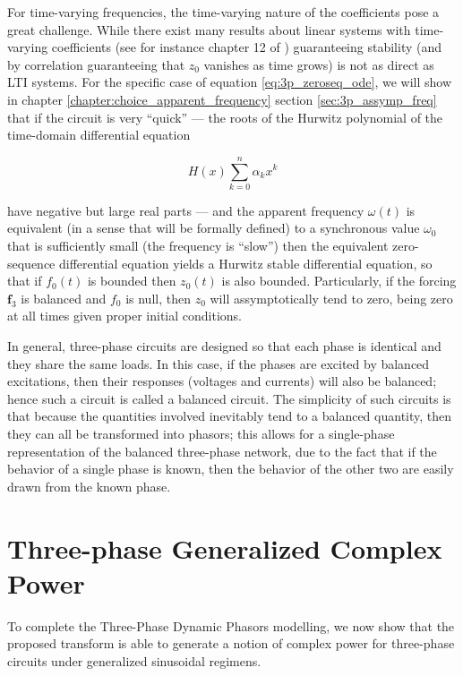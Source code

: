 	For time-varying frequencies, the time-varying nature of the coefficients pose a great challenge. While there exist many results about linear systems with time-varying coefficients (see for instance chapter 12 of \cite{beffaWeaklyNonlinearSystems2024}) guaranteeing stability (and by correlation guaranteeing that $z_0$ vanishes as time grows) is not as direct as LTI systems. For the specific case of equation \eqref{eq:3p_zeroseq_ode}, we will show in chapter \ref{chapter:choice_apparent_frequency} section \ref{sec:3p_assymp_freq} that if the circuit is very ``quick'' — the roots of the Hurwitz polynomial of the time-domain differential equation

\begin{equation} H(x) \sum\limits_{k=0}^n \alpha_k x^k \end{equation}

	\noindent have negative but large real parts — and the apparent frequency $\omega(t)$ is equivalent (in a sense that will be formally defined) to a synchronous value $\omega_0$ that is sufficiently small (the frequency is ``slow'') then the equivalent zero-sequence differential equation yields a Hurwitz stable differential equation, so that if $f_0(t)$ is bounded then $z_0(t)$ is also bounded. Particularly, if the forcing $\mathbf{f}_3$ is balanced and $f_0$ is null, then $z_0$ will assymptotically tend to zero, being zero at all times given proper initial conditions.

	In general, three-phase circuits are designed so that each phase is identical and they share the same loads. In this case, if the phases are excited by balanced excitations, then their responses (voltages and currents) will also be balanced; hence such a circuit is called a balanced circuit. The simplicity of such circuits is that because the quantities involved inevitably tend to a balanced quantity, then they can all be transformed into phasors; this allows for a single-phase representation of the balanced three-phase network, due to the fact that if the behavior of a single phase is known, then the behavior of the other two are easily drawn from the known phase.

\section{Three-phase Generalized Complex Power} %

	To complete the Three-Phase Dynamic Phasors modelling, we now show that the proposed transform is able to generate a notion of complex power for three-phase circuits under generalized sinusoidal regimens.	

